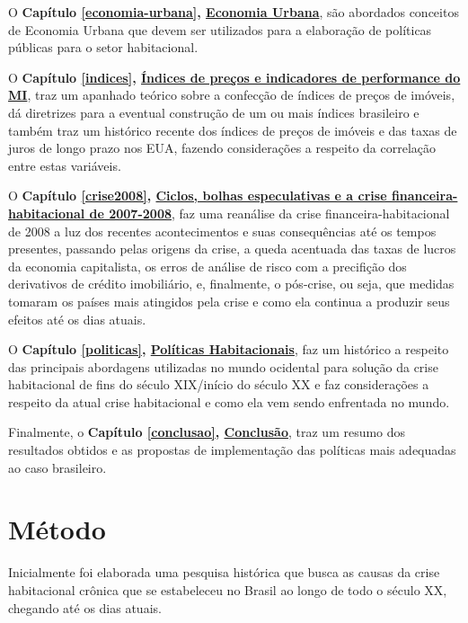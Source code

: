 \documentclass[
	12pt,				%
	oneside,			%
	a4paper,			%
	chapter=TITLE,		%
	section=TITLE,		%
	english,			%
	brazil				%
	]{abntex2}
\begin{document}
\begin{refsection}
O \textbf{Capítulo \ref{economia-urbana}, \protect\hyperlink{economia-urbana}{Economia Urbana}}, são abordados conceitos
de Economia Urbana que devem ser utilizados para a elaboração de políticas
públicas para o setor habitacional.

O \textbf{Capítulo \ref{indices}, \protect\hyperlink{indices}{Índices de preços e indicadores de performance do
\gls{MI}}}, traz um apanhado teórico sobre a confecção de índices de preços de
imóveis, dá diretrizes para a eventual construção de um ou mais índices
brasileiro e também traz um histórico recente dos índices de preços de imóveis e
das taxas de juros de longo prazo nos \gls{EUA}, fazendo considerações a
respeito da correlação entre estas variáveis.

O \textbf{Capítulo \ref{crise2008}, \protect\hyperlink{crise2008}{Ciclos, bolhas especulativas e a crise
financeira-habitacional de 2007-2008}}, faz uma reanálise da crise
financeira-habitacional de 2008 a luz dos recentes acontecimentos e suas
consequências até os tempos presentes, passando pelas origens da crise, a queda
acentuada das taxas de lucros da economia capitalista, os erros de análise de
risco com a precifição dos derivativos de crédito imobiliário, e, finalmente, o
pós-crise, ou seja, que medidas tomaram os países mais atingidos pela crise e
como ela continua a produzir seus efeitos até os dias atuais.

O \textbf{Capítulo \ref{politicas}, \protect\hyperlink{politicas}{Políticas Habitacionais}}, faz um histórico a
respeito das principais abordagens utilizadas no mundo ocidental para solução da
crise habitacional de fins do século XIX/início do século XX e faz considerações
a respeito da atual crise habitacional e como ela vem sendo enfrentada no mundo.

Finalmente, o \textbf{Capítulo \ref{conclusao}, \protect\hyperlink{conclusao}{Conclusão}}, traz um resumo dos
resultados obtidos e as propostas de implementação das políticas mais adequadas
ao caso brasileiro.

\printbibliography[heading=subbibintoc]
\end{refsection}
\hypertarget{metodo}{%
\chapter{Método}\label{metodo}}

Inicialmente foi elaborada uma pesquisa histórica que busca as causas da crise
habitacional crônica que se estabeleceu no Brasil ao longo de todo o século XX,
chegando até os dias atuais.
\end{document}
